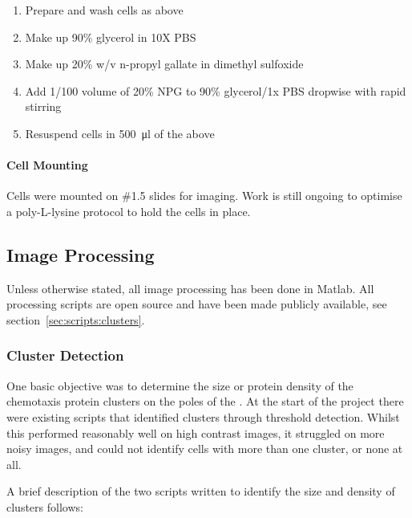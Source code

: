 \documentclass[../main.tex]{subfiles}
\begin{document}
\begin{enumerate}
\item Prepare and wash cells as above
\item Make up 90\% glycerol in 10X PBS
\item Make up 20\% w/v n-propyl gallate in dimethyl sulfoxide
\item Add 1/100 volume of 20\% NPG to 90\% glycerol/1x PBS dropwise with rapid stirring
\item Resuspend cells in \SI{500}{\micro\litre} of the above
\end{enumerate}

\paragraph{Cell Mounting} Cells were mounted on \#1.5 slides for imaging. Work is still ongoing to optimise a poly-L-lysine protocol to hold the cells in place.

\subsection{Image Processing}
\label{sec:methods:imageprocessing}
Unless otherwise stated, all image processing has been done in Matlab. All processing scripts are open source and have been made publicly available, see section~\ref{sec:scripts:clusters}.

\subsubsection{Cluster Detection}
One basic objective was to determine the size or protein density of the chemotaxis protein clusters on the poles of the \ecoli. At the start of the project there were existing scripts that identified clusters through threshold detection. Whilst this performed reasonably well on high contrast images, it struggled on more noisy images, and could not identify cells with more than one cluster, or none at all.

A brief description of the two scripts written to identify the size and density of clusters follows:
\end{document}
